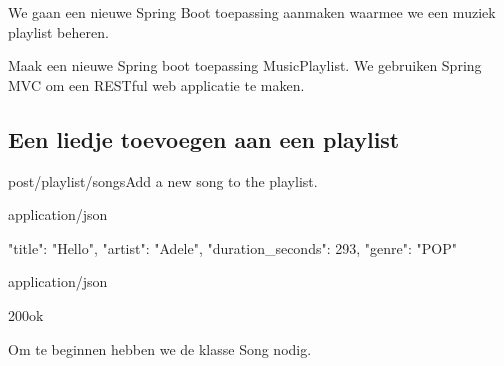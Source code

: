 We gaan een nieuwe Spring Boot toepassing aanmaken waarmee we een muziek playlist beheren. 

\begin{oefening}
Maak een nieuwe Spring boot toepassing MusicPlaylist. We gebruiken Spring MVC om een RESTful web applicatie te maken.  
\end{oefening}

\subsection{Een liedje toevoegen aan een playlist}

\begin{apiRoute}{post}{/playlist/songs}{Add a new song to the playlist.}
\begin{routeRequest}{application/json}
\begin{routeRequestBody}
{
  "title": "Hello",
  "artist": "Adele",
  "duration_seconds": 293,
  "genre": "POP"
}
\end{routeRequestBody}
\end{routeRequest}
\begin{routeResponse}{application/json}
\begin{routeResponseItem}{200}{ok}
\end{routeResponseItem}
\end{routeResponse}
\end{apiRoute}


Om te beginnen hebben we de klasse Song nodig. 

